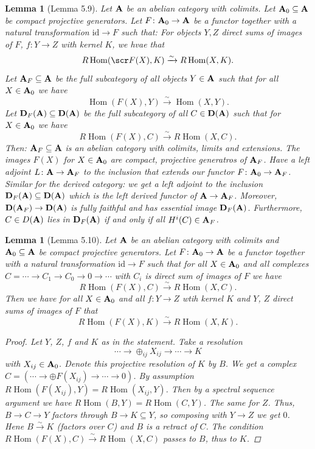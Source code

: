 \documentclass[A4paper, british, reqno]{amsart}
\theoremstyle{darkgreentheorem}
\newtheorem{lm}[thm]{Lemma}
\theoremstyle{darkbluedefinition}
\theoremstyle{darkredexample}
\theoremstyle{remark}
\DeclareMathOperator{\Hom}{Hom}
\newcommand{\1}{\mathbbm{1}}
\newcommand{\op}{\oplus}
\newcommand{\id}{\mathrm{id}}
\newcommand{\sub}{\subseteq}
\begin{document}
\begin{lm}[Lemma 5.9]
    Let $\mathbf{A}$ be an abelian category with colimits.
    Let $\bfA_{0}\sub \bfA$ be compact projective generators.
    Let $F\colon \mathbf{A}_{0}\to \mathbf{A}$ be a functor together with a natural transformation $\id\to F$ such that:
    For objects $Y,Z$ direct sums of images of $F$, $f\colon Y\to Z$ with kernel $K$, we hvae that
    \[ R\Hom(\F(X),K)\xrightarrow{\sim} R\Hom(X,K).\]
    Let $\bfA_{F}\sub \bfA$ be the full subcategory of all objects $Y\in \mathbf{A}$ such that for all $X\in \mathbf{A}_{0}$ we have
    \[ \Hom(F(X),Y)\xrightarrow{\sim}\Hom(X,Y).\]
    Let $\D_{F}(\bfA)\sub \D(\bfA)$ be the full subcategory of all $C\in \mathbf{D}(\mathbf{A})$ such that for $X\in \mathbf{A}_{0}$ we have
    \[ R\Hom(F(X),C)\xrightarrow{\sim}R\Hom(X,C).\]
    Then: $\bfA_{F}\sub \bfA$ is an abelian category with colimits, limits and extensions.
    The images $F(X)$ for $X\in \mathbf{A}_{0}$ are compact, projective generatros of $\mathbf{A}_{F}$.
    Have a left adjoint $L\colon \mathbf{A}\to \mathbf{A}_{F}$ to the inclusion that extends our functor $F\colon \mathbf{A}_{0}\to \mathbf{A}_{F}$.
    Similar for the derived category: we get a left adjoint to the inclusion $\D_{F}(\bfA)\sub \D(\bfA)$ which is the left derived functor of $\mathbf{A}\to \mathbf{A}_{F}$.
    Moreover, $\mathbf{D}(\mathbf{A}_{F})\to \mathbf{D}(\mathbf{A})$ is fully faithful and has essential image $\mathbf{D}_{F}(\mathbf{A})$.
    Furthermore, $C\in D(\mathbf{A})$ lies in $\mathbf{D}_{F}(\mathbf{A})$ if and only if all $H^{i}(C)\in \mathbf{A}_{F}$.
\end{lm}

\begin{lm}[Lemma 5.10]
    Let $\mathbf{A}$ be an abelian category with colimits and $\bfA_{0}\sub \bfA$ be compact projective generators.
    Let $F\colon \mathbf{A}_{0}\to \mathbf{A}$ be a functor together with a natural transformation $\id\to F$ such that for all $X\in \mathbf{A}_{0}$ and all complexes $C=\cdots\to C_{1}\to C_{0}\to 0\to \cdots $ with $C_{i}$ is direct sum of images of $F$ we have
    \[ R\Hom(F(X),C)\xrightarrow{\sim}R\Hom(X,C).\]
    Then we have for all $X\in \mathbf{A}_{0}$ and all $f\colon Y\to Z$ wtih kernel $K$ and $Y$, $Z$ direct sums of images of $F$ that
    \[ R\Hom(F(X),K)\xrightarrow{\sim}R\Hom(X,K).\]
    \begin{proof}
	Let $Y$, $Z$, $f$ and $K$ as in the statement.
	Take a resolution
	\[ \cdots \to \op_{ij}X_{ij}\to \cdots \to K\]
	with $X_{ij}\in \mathbf{A}_{0}$.
	Denote this projective resolution of $K$ by $B$.
	We get a complex $C=(\cdots \to \op F(X_{ij})\to \cdots \to 0)$.
	By assumption $R\Hom(F(X_{ij}),Y)=R\Hom(X_{ij},Y)$.
	Then by a spectral sequence argument we have $R\Hom(B,Y)=R\Hom(C,Y)$.
	The same for $Z$.
	Thus, $B\to C\to Y$ factors through $B\to K\sub Y$, so composing with $Y\to Z$ we get $0$.
	Hene $B\xrightarrow{\sim}K$ (factors over $C$) and $B$ is a retract of $C$.
	The condition $R\Hom(F(X),C)\xrightarrow{\sim}R\Hom(X,C)$ passes to $B$, thus to $K$.
    \end{proof}
\end{lm}
\end{document}
